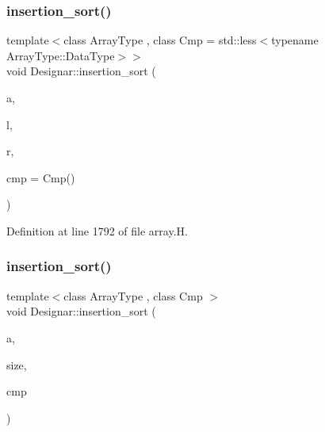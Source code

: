 \subsubsection{\texorpdfstring{insertion\+\_\+sort()}{insertion\_sort()}\hspace{0.1cm}{\footnotesize\ttfamily [2/6]}}
{\footnotesize\ttfamily template$<$class Array\+Type , class Cmp  = std\+::less$<$typename Array\+Type\+::\+Data\+Type$>$$>$ \\
void Designar\+::insertion\+\_\+sort (\begin{DoxyParamCaption}\item[{Array\+Type \&}]{a,  }\item[{\hyperlink{namespace_designar_a9d113d66a39e82b73727c72cd3a52f73}{lint\+\_\+t}}]{l,  }\item[{\hyperlink{namespace_designar_a9d113d66a39e82b73727c72cd3a52f73}{lint\+\_\+t}}]{r,  }\item[{Cmp \&\&}]{cmp = {\ttfamily Cmp()} }\end{DoxyParamCaption})\hspace{0.3cm}{\ttfamily [inline]}}



Definition at line 1792 of file array.\+H.

\mbox{\label{namespace_designar_a54b704ec22eb8fe7136b1bda64daf3a7}} 
\subsubsection{\texorpdfstring{insertion\+\_\+sort()}{insertion\_sort()}\hspace{0.1cm}{\footnotesize\ttfamily [3/6]}}
{\footnotesize\ttfamily template$<$class Array\+Type , class Cmp $>$ \\
void Designar\+::insertion\+\_\+sort (\begin{DoxyParamCaption}\item[{Array\+Type \&}]{a,  }\item[{\hyperlink{namespace_designar_a9d113d66a39e82b73727c72cd3a52f73}{lint\+\_\+t}}]{size,  }\item[{Cmp \&}]{cmp }\end{DoxyParamCaption})\hspace{0.3cm}{\ttfamily [inline]}}



